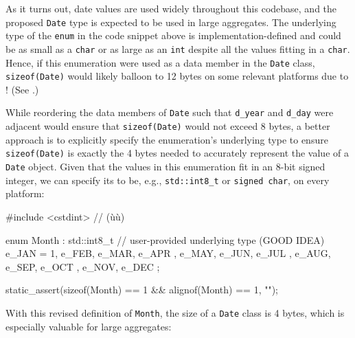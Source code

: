 %

\noindent As it turns out, date values are used widely throughout this codebase,
and the proposed \lstinline!Date! type is expected to be used in large
aggregates. The underlying type of the \lstinline!enum! in the code snippet
above is implementation-defined and could be as small as a \lstinline!char!
or as large as an \lstinline!int! despite all the values fitting in a
\lstinline!char!. Hence, if this enumeration were used as a data member in
the \lstinline!Date! class, \lstinline!sizeof(Date)! would likely balloon to
12 bytes on some relevant platforms due to !
(See .)

While reordering the data members of \lstinline!Date! such that \lstinline!d_year! and
\lstinline!d_day! were adjacent would ensure that \lstinline!sizeof(Date)!
would not exceed 8 bytes, a better approach is to explicitly specify the
enumeration's underlying type to ensure \lstinline!sizeof(Date)! is exactly
the 4 bytes needed to accurately represent the value of a
\lstinline!Date! object. Given that the values in this enumeration fit in
an 8-bit signed integer, we can specify its  to
be, e.g., \lstinline!std::int8_t! or \lstinline!signed!~\lstinline!char!, on
every platform:

\begin{emcppslisting}
#include <cstdint>  // (ù{}ù)

enum Month : std::int8_t  // user-provided underlying type (GOOD IDEA)
{
    e_JAN = 1, e_FEB, e_MAR,
    e_APR    , e_MAY, e_JUN,
    e_JUL    , e_AUG, e_SEP,
    e_OCT    , e_NOV, e_DEC
};

static_assert(sizeof(Month) == 1 && alignof(Month) == 1, "");
\end{emcppslisting}

\noindent With this revised definition of \lstinline!Month!, the size of a
\lstinline!Date! class is 4 bytes, which is especially valuable for large
aggregates:

